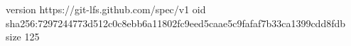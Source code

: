 version https://git-lfs.github.com/spec/v1
oid sha256:7297244773d512c0c8ebb6a11802fc9eed5caae5c9fafaf7b33ca1399cdd8fdb
size 125
